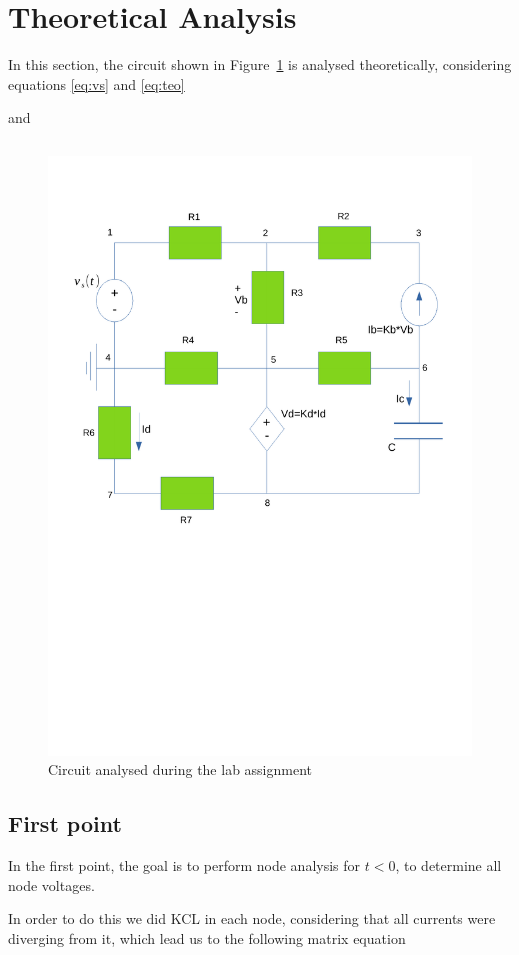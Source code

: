 \section{Theoretical Analysis}
\label{sec:theoretical}

\noindent \par In this section, the circuit shown in Figure~\ref{fig:Esquema_teo} is analysed theoretically, considering equations \ref{eq:vs} and \ref{eq:teo}

and

\begin{table}[h!]
\centering
\begin{tabularx}{0.7\textwidth} {
  | >{\raggedright\arraybackslash}X
  | >{\raggedleft\arraybackslash}X | }
 \hline
 
\end{tabularx}
\end{table}

\begin{figure}[h!] \centering
\includegraphics[width=0.6\linewidth]{Esquema_teo.pdf}
\caption{Circuit analysed during the lab assignment}
\label{fig:Esquema_teo}
\end{figure}

\subsection{First point}
\label{ssec:1T}
\noindent \par In the first point, the goal is to perform node analysis for $t<0$, to determine all node voltages.
\par In order to do this we did KCL in each node, considering that all currents were diverging from it, which lead us to the following matrix equation

